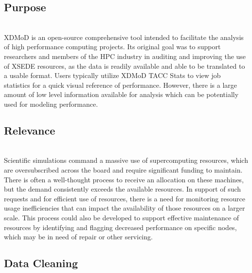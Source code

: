 \documentclass[10pt]{article}
\newenvironment{boxit}{
   \begin{lrbox}{\dummybox}
      \begin{minipage}{0.925\columnwidth}
      }{
      \end{minipage}
   \end{lrbox}
   \raisebox{-\depth}
      {\psshadowbox[framesep=1em,framearc=0.1,shadow=true]
         {\usebox{\dummybox}}}
   \vspace{0.005\textheight}
}
\begin{document}
\begin{center}
\begin{multicols}{3}
\begin{boxit}
               \subsection*{\red Purpose}
               \\XDMoD is an open-source comprehensive tool intended to facilitate the analysis of high performance computing projects. Its original goal was to support researchers and members of the HPC industry in auditing and improving the use of XSEDE resources, as the  data is readily available and able to be translated to a usable format. Users typically utilize XDMoD TACC Stats to view job statistics for a quick visual reference of performance. However, there is a large amount of low level information available for analysis which can be potentially used for modeling performance.

            \subsection*{\red Relevance}
             \\ Scientific simulations command a massive use of supercomputing resources, which are oversubscribed across the board and require significant funding to maintain. There is often a well-thought process to receive an allocation on these machines, but the demand consistently exceeds the available resources. In support of such requests and for efficient use of resources, there is a need for monitoring resource usage inefficiencies that can impact the availability of those resources on a larger scale. This process could also be developed to support effective maintenance of resources by identifying and flagging decreased performance on specific nodes, which may be in need of repair or other servicing. \\

         \end{boxit}

         \begin{boxit}
	        \section*{\red Data Cleaning}
	        \vspace{-0.75em}

\end{boxit}
\end{multicols}
\end{center}
\end{document}
